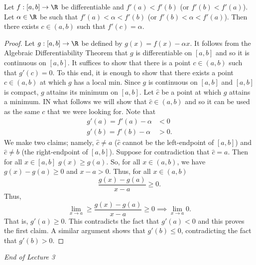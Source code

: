 \begin{theorem}\label{Darboux's Theorem}
    Let \( f: [a,b] \to \R  \) be differentiable and \( f'(a) < f'(b) \) (or \( f'(b) < f'(a) \)). Let \( \alpha \in \R  \) be such that \( f'(a) < \alpha < f'(b)  \) (or \( f'(b) < \alpha < f'(a) \)). Then there exists \( c \in (a,b) \) such that \( f'(c) = \alpha \).
\end{theorem}
\begin{proof}
    Let \( g:[a,b] \to \R  \) be defined by \( g(x) = f(x) - \alpha x  \). It follows from the Algebraic Differentiability Theorem that \( g  \) is differentiable on \( [a,b] \) and so it is continuous on \( [a,b] \). It suffices to show that there is a point \( c \in (a,b) \) such that \( g'(c) = 0 \). To this end, it is enough to show that there exists a point \( c \in (a,b) \) at which \( g  \) has a local min. Since \( g  \) is continuous on \( [a,b] \) and \( [a,b]  \) is compact, \( g  \) attains its minimum on \( [a,b] \). Let \( \hat{c} \) be a point at which \( g  \) attains a minimum. IN what follows we will show that \( \hat{c} \in (a,b) \) and so it can be used as the same \( c  \) that we were looking for. Note that  
    \begin{align*}
        g'(a) = f'(a) - \alpha &<  0 \\
        g'(b) = f'(b) - \alpha &> 0. 
    \end{align*}
    We make two claims; namely, \( \hat{c} \neq a  \) (\( \hat{c}  \) cannot be the left-endpoint of \( [a,b] \)) and \( \hat{c} \neq b  \) (the right-endpoint of \( [a,b] \)). Suppose for contradiction that \( \hat{c}= a  \). Then for all \( x \in [a,b] \) \( g(x) \geq g(a) \). So, for all \( x \in (a,b) \), we have \( g(x) - g(a) \geq 0  \) and \( x - a > 0  \). Thus, for all \( x \in (a,b) \)
    \[  \frac{ g(x) - g(a) }{ x - a  }  \geq 0.  \]
    Thus, 
    \[  \lim_{ x \to a }  \geq \frac{ g(x) - g(a) }{  x - a  }  \geq 0 \implies \lim_{ x \to a  }  0.   \]
    That is, \( g'(a) \geq 0  \). This contradicts the fact that \( g'(a) < 0 \) and this proves the first claim.
    A similar argument shows that \( g'(b) \leq 0  \), contradicting the fact that \( g'(b) > 0  \).
\end{proof}



\begin{center}
    \textit{End of Lecture 3} 
\end{center}



